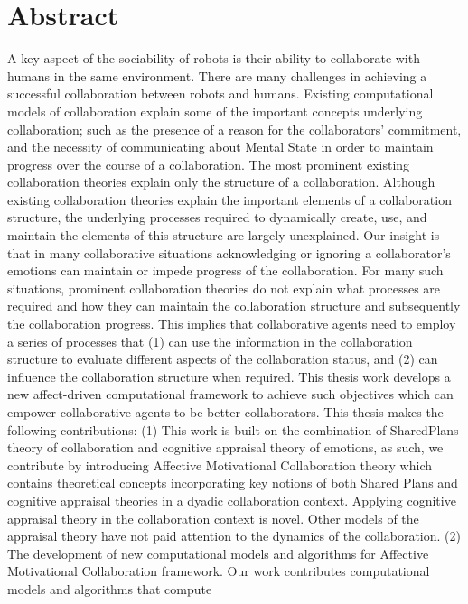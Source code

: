 \documentclass[12pt]{report}
\begin{document}

\chapter*{Abstract}
A key aspect of the sociability of robots is their ability to collaborate with
humans in the same environment. There are many challenges in achieving a
successful collaboration between robots and humans. Existing computational
models of collaboration explain some of the important concepts underlying
collaboration; such as the presence of a reason for the collaborators’
commitment, and the necessity of communicating about Mental State in order to
maintain progress over the course of a collaboration. The most prominent
existing collaboration theories explain only the structure of a collaboration.
Although existing collaboration theories explain the important elements of a
collaboration structure, the underlying processes required to dynamically
create, use, and maintain the elements of this structure are largely
unexplained. Our insight is that in many collaborative situations acknowledging
or ignoring a collaborator's emotions can maintain or impede progress of the
collaboration. For many such situations, prominent collaboration theories do not
explain what processes are required and how they can maintain the collaboration
structure and subsequently the collaboration progress. This implies that
collaborative agents need to employ a series of processes that (1) can use the
information in the collaboration structure to evaluate different aspects of the
collaboration status, and (2) can influence the collaboration structure when
required. This thesis work develops a new affect-driven computational framework
to achieve such objectives which can empower collaborative agents to be better
collaborators. This thesis makes the following contributions: (1) This work is
built on the combination of SharedPlans theory of collaboration and cognitive
appraisal theory of emotions, as such, we contribute by introducing Affective
Motivational Collaboration theory which contains theoretical concepts
incorporating key notions of both Shared Plans and cognitive appraisal theories
in a dyadic collaboration context. Applying cognitive appraisal theory in the
collaboration context is novel. Other models of the appraisal theory have not
paid attention to the dynamics of the collaboration. (2) The development of new
computational models and algorithms for Affective Motivational Collaboration
framework. Our work contributes computational models and algorithms that compute
\end{document}

